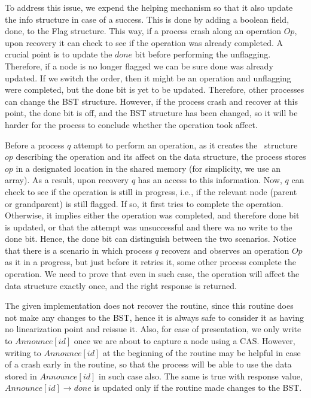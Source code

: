 To address this issue, we expend the helping mechanism so that it also update the info structure in case of a success. This is done by adding a boolean field, done, to the Flag structure. This way, if a process crash along an operation $Op$, upon recovery it can check to see if the operation was already completed. A crucial point is to update the $done$ bit before performing the unflagging. Therefore, if a node is no longer flagged we can be sure done was already updated.
If we switch the order, then it might be an operation and unflagging were completed, but the done bit is yet to be updated. Therefore, other processes can change the BST structure. However, if the process crash and recover at this point, the done bit is off, and the BST structure has been changed, so it will be harder for the process to conclude whether the operation took affect.

Before a process $q$ attempt to perform an operation, as it creates the \Flag\ structure $op$ describing the operation and its affect on the data structure, the process stores $op$ in a designated location in the shared memory (for simplicity, we use an array). As a result, upon recovery $q$ has an access to this information. Now, $q$ can check to see if the operation is still in progress, i.e., if the relevant node (parent or grandparent) is still flagged. If so, it first tries to complete the operation. Otherwise, it implies either the operation was completed, and therefore done bit is updated, or that the attempt was unsuccessful and there wa no write to the done bit. Hence, the done bit can distinguish between the two scenarios.
Notice that there is a scenario in which process $q$ recovers and observes an operation $Op$ as it in a progress, but just before it retries it, some other process complete the operation. We need to prove that even in such case, the operation will affect the data structure exactly once, and the right response is returned.

The given implementation does not recover the  routine, since this routine does not make any changes to the BST, hence it is always safe to consider it as having no linearization point and reissue it. Also, for ease of presentation, we only write to $Announce[id]$ once we are about to capture a node using a CAS. However, writing to $Announce[id]$ at the beginning of the routine may be helpful in case of a crash early in the routine, so that the process will be able to use the data stored in $Announce[id]$ in such case also. The same is true with response value, $Announce[id]\rightarrow done$ is updated only if the routine made changes to the BST.

